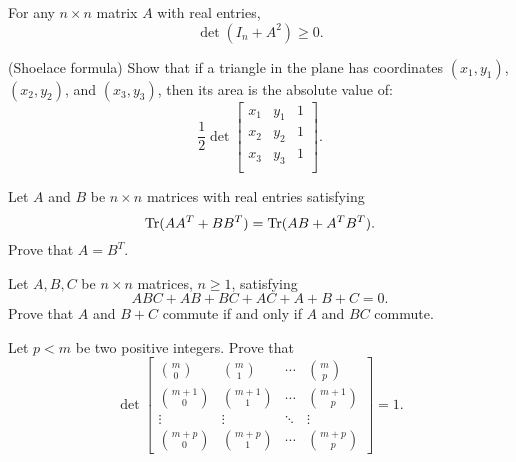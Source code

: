 \documentclass[12pt]{article}
\begin{document}
        \begin{exercise}
        For any $n \times n$ matrix $A$ with real entries,
        \[
        \det(I_{n} + A^{2}) \geq 0.
        \]
        \end{exercise}
        
        \begin{exercise}
        (Shoelace formula) Show that if a triangle in the plane has coordinates $(x_{1}, y_{1})$, $(x_{2}, y_{2})$, and $(x_{3}, y_{3})$, then its area is the absolute value of:
        \[\frac{1}{2} \det \begin{bmatrix}
        x_{1}&y_{1}&1\\
        x_{2}&y_{2}&1\\
        x_{3}&y_{3}&1\\
        \end{bmatrix}.
        \]
        \end{exercise}

        \begin{exercise}
            Let $A$ and $B$ be $n \times n$ matrices with real entries satisfying 
            \[\operatorname{Tr}(A A^{T} + B B^{T}) = \operatorname{Tr}(AB + A^{T}B^{T}).  
            \]
            Prove that $A = B^{T}$. 
            \end{exercise}
            
            \begin{exercise}
                Let $A, B, C$ be $n \times n$ matrices, $n \geq 1$, satisfying 
            \[ABC + AB + BC + AC + A + B + C = 0.
            \]
            Prove that $A$ and $B + C$ commute if and only if $A$ and $BC$ commute. 
            \end{exercise}
            
            \begin{exercise}
            Let $p < m$ be two positive integers. Prove that 
            \[\det \begin{bmatrix}
            \binom{m}{0}&\binom{m}{1}&\cdots&\binom{m}{p}\\
            \binom{m + 1}{0}&\binom{m + 1}{1}&\cdots&\binom{m + 1}{p}\\
            \vdots&\vdots&\ddots&\vdots\\
            \binom{m + p}{0}&\binom{m + p}{1}&\cdots&\binom{m + p}{p} 
            \end{bmatrix} = 1.
            \]
            \end{exercise}
            
\end{document}
